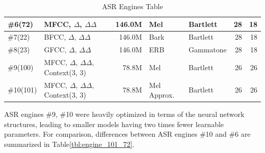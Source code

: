 \begin{table}[H]
\begin{tabular}{ !{\color{ytblborder}\vrule}l!{\color{ytblborder}\vrule}lrllrr| }
    \hline
      \#6(72)  
        & MFCC, \(\Delta\), \(\Delta\Delta\) 
        & 146.0M
        & Mel 
        & Bartlett
        & 28 
        & 18 \\
    \hline

    \hline
      \#7(22)  
        & BFCC, \(\Delta\), \(\Delta\Delta\) 
        & 146.0M
        & Bark 
        & Bartlett
        & 28 
        & 18 \\
    \hline

    \hline
      \#8(23)  
        & GFCC, \(\Delta\), \(\Delta\Delta\) 
        & 146.0M
        & ERB
        & Gammatone
        & 28 
        & 18 \\
    \hline

    \hline
      \#9(100)  
        & MFCC, \(\Delta\), \(\Delta\Delta\), Context(3, 3)
        & 78.8M
        & Mel 
        & Bartlett
        & 26 
        & 26 \\
    \hline

    \hline
      \#10(101)
        & MFCC, \(\Delta\), \(\Delta\Delta\), Context(3, 3)
        & 78.8M
        & Mel Approx.
        & Bartlett
        & 26 
        & 26 \\
    \hline

    \hline
\end{tabular}
\caption{ASR Engines Table}
\label{tbl:asr_engines}
\end{table}
\vspace{-0.7cm}
ASR engines \#9, \#10 were heavily 
optimized in terms of the neural network structures, 
leading to smaller models having two times fewer learnable parameters.
For comparison, differences between ASR engines \#10
and \#6 are summarized in
Table\;\ref{tbl:engine_101_72}.
